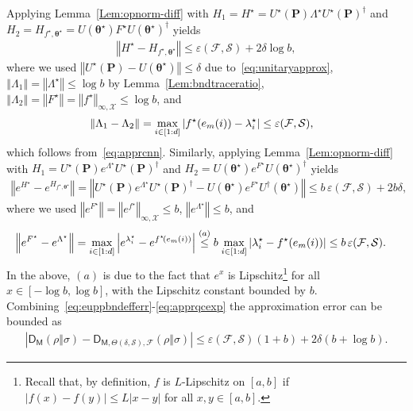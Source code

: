 \documentclass[a4paper,onecolumn,11pt,accepted=2026-05-12]{quantumarticle}
\newcommand{\norm}[1]{\left\Vert#1\right\Vert}
\newcommand{\abs}[1]{\left\vert#1\right\vert}
\newcommand{\sD}{\mathsf{D}}
\newcommand{\cF}{\mathcal{F}}
\newcommand{\cS}{\mathcal{S}}
\newcommand{\cX}{\mathcal{X}}
\begin{document}
\medskip
\noindent Applying Lemma~\ref{Lem:opnorm-diff} with $H_1=H^{\star}=U^{\star}(\mathbf{P})\Lambda^{\star}U^{\star}(\mathbf{P})^{\dag}$ and $H_2=H_{f^{\star},\bm{\theta}^{\star}}=U(\bm{\theta}^{\star})F^{\star} U(\bm{\theta}^{\star})^{\dag}$ yields
\begin{align}
 \norm{H^{\star}-H_{f^{\star},\bm{\theta}^{\star}}}\leq \varepsilon(\cF,\cS) +  2 \delta \log  b,\label{eq:approx-herm-op}
\end{align}
where we used $\norm{U^{\star}(\mathbf{P})-U(\bm{\theta}^{\star})} \leq \delta$ due to~\eqref{eq:unitaryapprox},  $\norm{\Lambda_1}=\norm{\Lambda^{\star}}\leq \log b$ by Lemma~\ref{Lem:bndtraceratio},  $\norm{\Lambda_2}=\norm{F^{\star}}=
\norm{f^{\star}}_{\infty,\cX} \leq \log b$, and 
\begin{align}
    &\norm{\Lambda_1-\Lambda_2}=\max_{i \in [1:d]} \abs{f^{\star}(e_m(i))-\lambda_i^{\star}} \leq \varepsilon(\cF,\cS),\notag 
\end{align}
which follows from~\eqref{eq:apprcnn}.  
Similarly, applying Lemma~\ref{Lem:opnorm-diff} with $H_1=U^{\star}(\mathbf{P})e^{\Lambda^{\star}}U^{\star}(\mathbf{P})^{\dag}$ and $H_2=U(\bm{\theta}^{\star})e^{F^{\star}} U(\bm{\theta}^{\star})^{\dag}$ yields
\begin{align}
\norm{e^{H^{\star}}-e^{H_{f^{\star},\bm{\theta}^{\star}}}}=\norm{U^{\star}(\mathbf{P})e^{\Lambda^{\star}}U^{\star}(\mathbf{P})^{\dag}-U(\bm{\theta}^{\star})e^{F^{\star}}U^{\dag}(\bm{\theta}^{\star})}  \leq  b\,\varepsilon(\cF,\cS)+2 b\delta,  \label{eq:apprqcexp}
\end{align}
where we used $
\norm{e^{F^{\star}}} =\norm{e^{f^{\star}}}_{\infty,\cX} \leq b$, $
\norm{e^{\Lambda^{\star}}}  \leq b$, and 
\begin{align}
\norm{e^{F^{\star}}-e^{\Lambda^{\star}}}=\max_{i \in [1:d]} \abs{e^{\lambda_i^{\star}}-e^{f^{\star}\!\left(e_m(i)\right)}} 
  &\stackrel{(a)}{\leq} b\mspace{2 mu} \max_{i \in [1:d]} \abs{\lambda_i^{\star}-f^{\star}\!\left(e_m(i)\right)}  \leq b \, \varepsilon(\cF,\cS).\notag
\end{align}
In the above,  $(a)$ is due to the fact that $e^x$ is Lipschitz\footnote{Recall that, by definition, $f$ is $L$-Lipschitz on $[a,b]$ if   $|f(x)-f(y)| \leq L \abs{x-y}$ for all $x,y \in [a,b]$.} for all $x \in [-\log  b ,\log  b ]$, with the Lipschitz constant bounded by $b$.  
Combining~\eqref{eq:euppbndefferr}-\eqref{eq:apprqcexp}  the approximation error can be bounded as
\begin{align}
  \abs{\sD_{\mathsf{M}}(\rho\Vert\sigma) -\sD_{\mathsf{M},\Theta(\delta,\cS),\cF}(\rho\Vert\sigma)} \leq \varepsilon(\cF,\cS)(1+b)+  2\delta  (b+\log  b). \label{eq:approxerr} 
\end{align}
\end{document}
